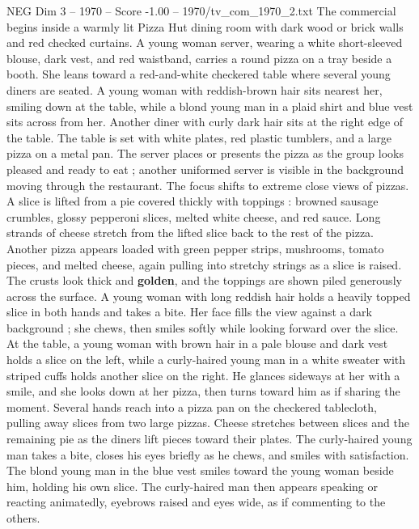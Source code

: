 \begin{textsample}{NEG Dim 3 – 1970 – Score -1.00 – 1970/tv\_com\_1970\_2.txt}  \label{ex:f3_neg_069}
The commercial begins inside a warmly lit Pizza Hut dining room with dark wood or brick walls and red checked curtains.
A young woman server, wearing a white short-sleeved blouse, dark vest, and red waistband, carries a round pizza on a tray beside a booth.
She leans toward a red-and-white checkered table where several young diners are seated.
A young woman with reddish-brown hair sits nearest her, smiling down at the table, while a blond young man in a plaid shirt and blue vest sits across from her.
Another diner with curly dark hair sits at the right edge of the table.
The table is set with white plates, red plastic tumblers, and a large pizza on a metal pan.
The server places or presents the pizza as the group looks pleased and ready to eat ; another uniformed server is visible in the background moving through the restaurant.
The focus shifts to extreme close views of pizzas.
A slice is lifted from a pie covered thickly with toppings : browned sausage crumbles, glossy pepperoni slices, melted white cheese, and red sauce.
Long strands of cheese stretch from the lifted slice back to the rest of the pizza.
Another pizza appears loaded with green pepper strips, mushrooms, tomato pieces, and melted cheese, again pulling into stretchy strings as a slice is raised.
The crusts look thick and \textbf{golden}, and the toppings are shown piled generously across the surface.
A young woman with long reddish hair holds a heavily topped slice in both hands and takes a bite.
Her face fills the view against a dark background ; she chews, then smiles softly while looking forward over the slice.
At the table, a young woman with brown hair in a pale blouse and dark vest holds a slice on the left, while a curly-haired young man in a white sweater with striped cuffs holds another slice on the right.
He glances sideways at her with a smile, and she looks down at her pizza, then turns toward him as if sharing the moment.
Several hands reach into a pizza pan on the checkered tablecloth, pulling away slices from two large pizzas.
Cheese stretches between slices and the remaining pie as the diners lift pieces toward their plates.
The curly-haired young man takes a bite, closes his eyes briefly as he chews, and smiles with satisfaction.
The blond young man in the blue vest smiles toward the young woman beside him, holding his own slice.
The curly-haired man then appears speaking or reacting animatedly, eyebrows raised and eyes wide, as if commenting to the others.

\end{textsample}

